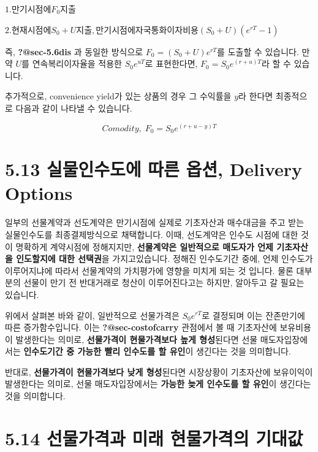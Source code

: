 \documentclass[
  letterpaper,
  DIV=11,
  numbers=noendperiod]{scrreprt}
\begin{document}
\(1. 만기시점에 F_0 지출\)

\(2. 현재시점에 S_0+U 지출, 만기시점에 자국통화 이자비용 (S_0+U)(e^{rT}-1)\)

즉, \textbf{?@sec-5.6dis} 과 동일한 방식으로 \(F_0=(S_0+U)e^{rT}\)를
도출할 수 있습니다. 만약 \(U\)를 연속복리이자율을 적용한 \(S_0e^{uT}\)로
표현한다면, \(F_0=S_0e^{(r+u)T}\)라 할 수 있습니다.

추가적으로, convenience yield가 있는 상품의 경우 그 수익률을 \(y\)라
한다면 최종적으로 다음과 같이 나타낼 수 있습니다.

\[Comodity,\;F_0=S_0e^{(r+u-y)T}\]

\section*{5.13 실물인수도에 따른 옵션, Delivery
Options}\label{uxc2e4uxbb3cuxc778uxc218uxb3c4uxc5d0-uxb530uxb978-uxc635uxc158-delivery-options}


일부의 선물계약과 선도계약은 만기시점에 실제로 기초자산과 매수대금을
주고 받는 실물인수도를 최종결제방식으로 채택합니다. 이때, 선도계약은
인수도 시점에 대한 것이 명확하게 계약시점에 정해지지만,
\textbf{선물계약은 일반적으로 매도자가 언제 기초자산을 인도할지에 대한
선택권}을 가지고있습니다. 정해진 인수도기간 중에, 언제 인수도가
이루어지냐에 따라서 선물계약의 가치평가에 영향을 미치게 되는 것 입니다.
물론 대부분의 선물이 만기 전 반대거래로 청산이 이루어진다고는 하지만,
알아두고 갈 필요는 있습니다.

위에서 살펴본 바와 같이, 일반적으로 선물가격은 \(S_0e^{rT}\)로 결정되며
이는 잔존만기에 따른 증가함수입니다. 이는 \textbf{?@sec-costofcarry}
관점에서 볼 때 기초자산에 보유비용이 발생한다는 의미로,
\textbf{선물가격이 현물가격보다 높게 형성}된다면 선물 매도자입장에서는
\textbf{인수도기간 중 가능한 빨리 인수도를 할 유인}이 생긴다는 것을
의미합니다.

반대로, \textbf{선물가격이 현물가격보다 낮게 형성}된다면 시장상황이
기초자산에 보유이익이 발생한다는 의미로, 선물 매도자입장에서는
\textbf{가능한 늦게 인수도를 할 유인}이 생긴다는 것을 의미합니다.

\section*{5.14 선물가격과 미래 현물가격의
기대값}\label{uxc120uxbb3cuxac00uxaca9uxacfc-uxbbf8uxb798-uxd604uxbb3cuxac00uxaca9uxc758-uxae30uxb300uxac12}
\end{document}
